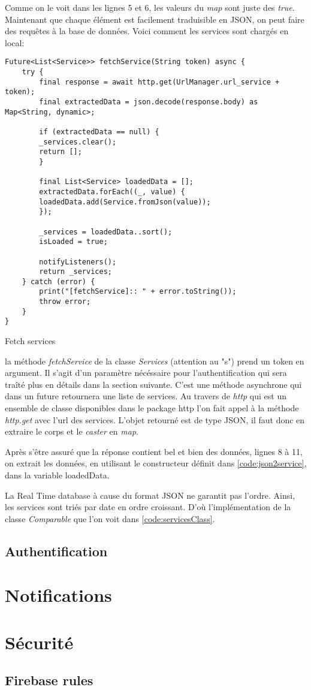 Comme on le voit dans les lignes 5 et 6, les valeurs du \textit{map} sont juste des \textit{true}. Maintenant que chaque élément est facilement traduisible en JSON, on peut faire des requêtes à la base de données. Voici comment les services sont chargés en local:
\begin{listing}[!h]
\begin{verbatim}
Future<List<Service>> fetchService(String token) async {
    try {
        final response = await http.get(UrlManager.url_service + token);
        final extractedData = json.decode(response.body) as Map<String, dynamic>;

        if (extractedData == null) {
        _services.clear();
        return [];
        }

        final List<Service> loadedData = [];
        extractedData.forEach((_, value) {
        loadedData.add(Service.fromJson(value));
        });

        _services = loadedData..sort();
        isLoaded = true;

        notifyListeners();
        return _services;
    } catch (error) {
        print("[fetchService]:: " + error.toString());
        throw error;
    }
}    
\end{verbatim}
\caption{Fetch services}
\label{code:fetchService}
\end{listing}

la méthode \textit{fetchService} de la classe \textit{Services} (attention au "s") prend un token en argument. Il s'agit d'un paramètre nécéssaire pour l'authentification qui sera traîté plus en détails dans la section suivante. C'est une méthode asynchrone qui dans un future retournera une liste de services. Au travers de \textit{http} qui est un ensemble de classe disponibles dans le package http l'on fait appel à la méthode \textit{http.get} avec l'url des services. L'objet retourné est de type JSON, il faut donc en extraire le corps et le \textit{caster} en \textit{map}.

Après s'être assuré que la réponse contient bel et bien des données, lignes 8 à 11, on extrait les données, en utilisant le constructeur définit dans \ref{code:json2service}, dans la variable loadedData. 

La Real Time database à cause du format JSON ne garantit pas l'ordre. Ainsi, les services sont triés par date en ordre croissant. D'où l'implémentation de la classe \textit{Comparable} que l'on voit dans \ref{code:servicesClass}.

\subsection{Authentification}

\section{Notifications}



\section{Sécurité}


\subsection{Firebase rules}
